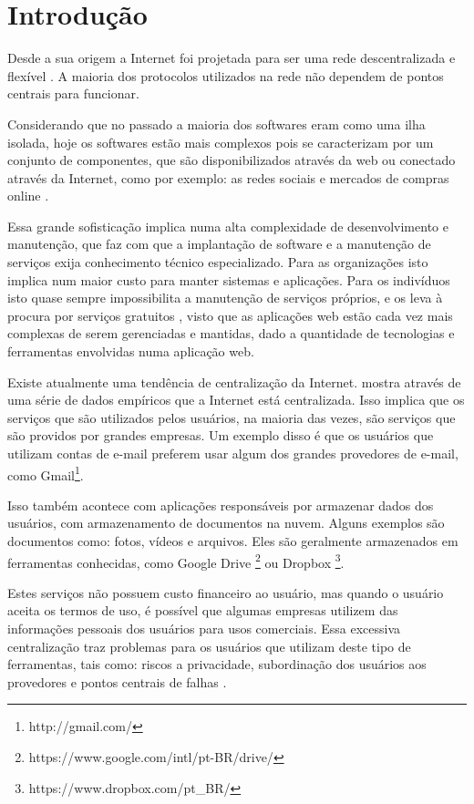 \chapter{Introdução}
\label{cap-introducao}

Desde a sua origem a Internet foi projetada para ser uma rede
descentralizada e flexível \cite{galaxia}. A maioria dos protocolos
utilizados na rede não dependem de pontos centrais para funcionar. 

Considerando que no passado a maioria dos softwares eram como uma ilha isolada, hoje os softwares 
estão mais complexos pois se caracterizam por um conjunto de componentes, que 
são disponibilizados através da web ou conectado através da Internet,
como por exemplo: as redes sociais e mercados de compras online \cite{byhand}.

Essa grande sofisticação implica numa alta complexidade de
desenvolvimento e manutenção, que faz com que a
implantação de software e a manutenção de serviços exija conhecimento técnico
especializado. Para as organizações isto implica num maior
custo para manter sistemas e aplicações. Para os indivíduos isto quase sempre
impossibilita a manutenção de serviços próprios, e os leva à procura por serviços
gratuitos \cite{shak2015}, visto que as aplicações web estão cada vez mais complexas de serem gerenciadas e mantidas, dado a quantidade de tecnologias e ferramentas envolvidas numa aplicação web.

Existe atualmente uma tendência de centralização da Internet. 
mostra
através de uma série de dados empíricos que a Internet está centralizada. Isso
implica que os serviços que são utilizados pelos usuários, na maioria
das vezes, são serviços que são providos por grandes empresas. 
Um exemplo disso é que os usuários que utilizam contas de e-mail preferem usar algum
dos grandes provedores de e-mail, como Gmail\footnote{http://gmail.com/}. 

Isso também acontece com aplicações responsáveis por armazenar dados dos usuários,
com armazenamento de documentos na nuvem. Alguns exemplos são 
documentos como: fotos, vídeos e arquivos. Eles são geralmente armazenados em 
ferramentas conhecidas, como Google Drive 
\footnote{https://www.google.com/intl/pt-BR/drive/} ou Dropbox \footnote{https://www.dropbox.com/pt\_BR/}. 

Estes serviços não possuem custo financeiro ao usuário, mas quando o usuário aceita os
termos de uso, é possível que algumas empresas utilizem das informações pessoais dos
usuários para usos comerciais. Essa excessiva centralização traz problemas para os usuários que utilizam deste tipo de ferramentas, tais como: riscos a privacidade, subordinação dos usuários
aos provedores e pontos centrais de falhas \cite{shak2015}. 

